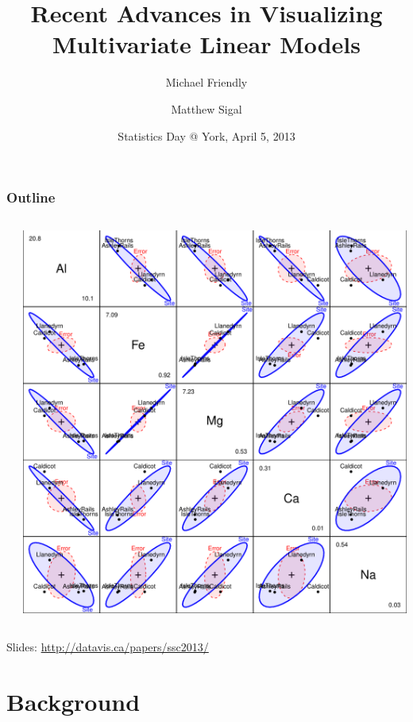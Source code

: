 \documentclass[10pt,t]{beamer}
\title{\small{Recent Advances in Visualizing Multivariate Linear Models}}
\author[Friendly, Sigal]{Michael Friendly \and Matthew Sigal}
\date[SSC] %
{Statistics Day @ York, April 5, 2013}
\begin{document}
\begin{frame}
\titlepage
\end{frame}

\begin{frame}
  \frametitle{Outline}
	\begin{columns}[c]
	  \begin{column}{.6\textwidth}
	  \tableofcontents
	  \end{column}
	  \begin{column}{.4\textwidth}
	  \includegraphics[width=\textwidth]{figures/pottery-HE3}
	  \end{column}
	\end{columns}
	\begin{center}
	  Slides: \url{http://datavis.ca/papers/ssc2013/}
	\end{center}
\end{frame}

\section{Background}

\end{document}
